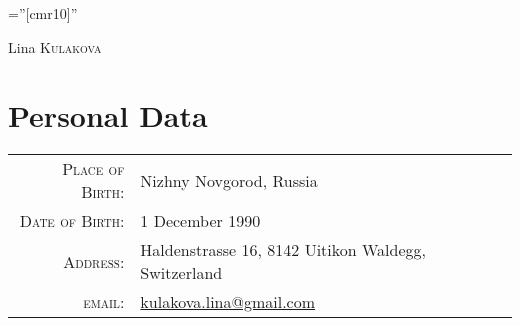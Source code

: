 \documentclass[a4paper,10pt]{article}
\begin{document}
\pagestyle{empty} %

\font\fb=''[cmr10]'' %

\par{%
		{\Huge Lina \textsc{Kulakova}
	}\bigskip\par}

	
\section{Personal Data}

\begin{tabular}{rl}
    \textsc{Place of Birth:} & Nizhny Novgorod, Russia \\
    \textsc{Date of Birth:} & 1 December 1990 \\
    \textsc{Address:}   & Haldenstrasse 16, 8142 Uitikon Waldegg, Switzerland \\
    \textsc{email:}     & \href{mailto:kulakova.lina@gmail.com}{kulakova.lina@gmail.com}
\end{tabular}

\end{document}
